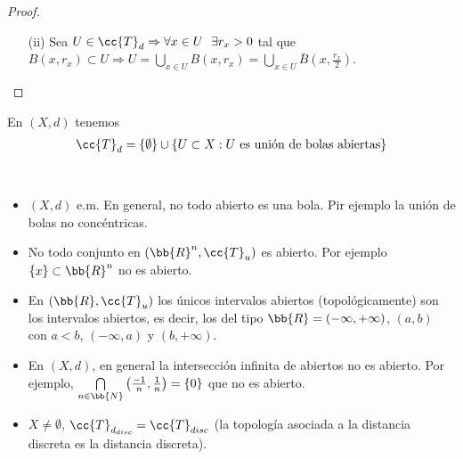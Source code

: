 \begin{prop}
\begin{proof}
\begin{enumerate}
\begin{center}
            \end{center}
            
            \item[(ii)] Sea $U \in \cc{T}_d \Rightarrow \forall x \in U \ \ \exists r_x >0$ tal que $B(x,r_x)\subset U \Rightarrow U = \bigcup\limits_{x\in U}B(x, r_x) = \bigcup\limits_{x\in U}\overline{B}\left(x, \frac{r_x}{2}\right)$.
            
        \end{enumerate}
    \end{proof}
\end{prop}

\begin{coro}
    En $(X,d)$ tenemos 
    \begin{gather*}
        \cc{T}_d=\{\emptyset\}\cup\{U \subset X : U \text{ es unión de bolas abiertas}\}
    \end{gather*}
    \endsquare
\end{coro}

\begin{ejemplo}\
    \begin{itemize}
        \item $(X,d)$ e.m. En general, no todo abierto es una bola. Pir ejemplo la unión de bolas no concéntricas.
        \item No todo conjunto en $(\bb{R}^n, \cc{T}_u)$ es abierto. Por ejemplo $\{x\}\subset \bb{R}^n$ no es abierto.
        \item En $(\bb{R}, \cc{T}_u)$ los únicos intervalos abiertos (topológicamente) son los intervalos abiertos, es decir, los del tipo $\bb{R}=(-\infty, +\infty)$, $(a,b)$ con $a<b$, $(-\infty, a)$ y $(b, +\infty)$.
        \item En $(X, d)$, en general la intersección infinita de abiertos no es abierto. Por ejemplo, $\bigcap\limits_{n\in \bb{N}}\left(\frac{-1}{n}, \frac{1}{n}\right) = \{0\}$ que no es abierto.
        \item $X\neq \emptyset$, $\cc{T}_{d_{disc}}=\cc{T}_{disc}$ (la topología asociada a la distancia discreta es la distancia discreta).
    \end{itemize}
    \endsquare
\end{ejemplo}

